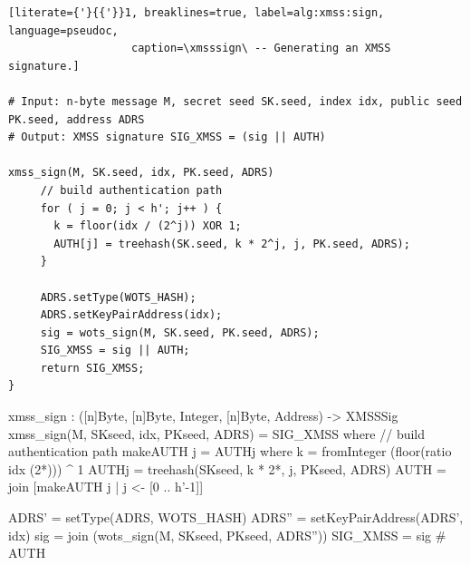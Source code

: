 \begin{lstlisting}[literate={'}{{'}}1, breaklines=true, label=alg:xmss:sign, language=pseudoc,
                   caption=\xmsssign\ -- Generating an XMSS signature.]
   
# Input: n-byte message M, secret seed SK.seed, index idx, public seed PK.seed, address ADRS
# Output: XMSS signature SIG_XMSS = (sig || AUTH)

xmss_sign(M, SK.seed, idx, PK.seed, ADRS)
     // build authentication path
     for ( j = 0; j < h'; j++ ) {
       k = floor(idx / (2^j)) XOR 1;
       AUTH[j] = treehash(SK.seed, k * 2^j, j, PK.seed, ADRS);
     }
     
     ADRS.setType(WOTS_HASH);
     ADRS.setKeyPairAddress(idx);
     sig = wots_sign(M, SK.seed, PK.seed, ADRS);
     SIG_XMSS = sig || AUTH;
     return SIG_XMSS;
}

\end{lstlisting}
     
\begin{code}
  xmss_sign : ([n]Byte, [n]Byte, Integer, [n]Byte, Address) -> XMSSSig
  xmss_sign(M, SKseed, idx, PKseed, ADRS) = SIG_XMSS where
    // build authentication path
    makeAUTH j = AUTHj where
      k = fromInteger (floor(ratio idx (2^^j))) ^ 1
      AUTHj = treehash(SKseed, k * 2^^j, j, PKseed, ADRS)
    AUTH = join [makeAUTH j | j <- [0 .. h'-1]]

    ADRS' = setType(ADRS, WOTS_HASH)
    ADRS'' = setKeyPairAddress(ADRS', idx)
    sig = join (wots_sign(M, SKseed, PKseed, ADRS''))
    SIG_XMSS = sig # AUTH
\end{code}

% 
%    
% 
%      

